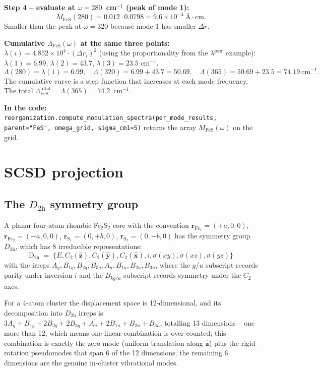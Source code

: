 \documentclass[10pt,a4paper,twoside]{article}
\newcommand{\rvec}{\mathbf{r}}
\newcommand{\xhat}{\hat{\mathbf{x}}}
\newcommand{\yhat}{\hat{\mathbf{y}}}
\newcommand{\zhat}{\hat{\mathbf{z}}}
\newcommand{\fn}[1]{\texttt{#1}}
\begin{document}
\begin{workedexample}
\textbf{Step 4 -- evaluate at $\omega = 280$~cm$^{-1}$ (peak of mode 1):}
\[
  M_\text{FeS}(280) = 0.012 \cdot 0.0798 = 9.6 \times 10^{-4}~\text{\AA{}}\cdot\text{cm}.
\]
Smaller than the peak at $\omega = 320$ because mode 1 has smaller
$\Delta r$.

\textbf{Cumulative $\Lambda_\text{FeS}(\omega)$ at the same three points:}
$\lambda(i) = 4.852 \times 10^4 \cdot (\Delta r_i)^2$ (using the
proportionality from the $\lambda^\text{pair}$ example):
$\lambda(1) = 6.99$, $\lambda(2) = 43.7$, $\lambda(3) = 23.5$
cm$^{-1}$.
\[
  \Lambda(280) = \lambda(1) = 6.99,
  \quad
  \Lambda(320) = 6.99 + 43.7 = 50.69,
  \quad
  \Lambda(365) = 50.69 + 23.5 = 74.19~\text{cm}^{-1}.
\]
The cumulative curve is a step function that increases at each
mode frequency. The total $\Lambda^\text{total}_\text{FeS} =
\Lambda(365) = 74.2$~cm$^{-1}$.

\textbf{In the code:}
\fn{reorganization.compute\_modulation\_spectra(per\_mode\_results,
parent="FeS", omega\_grid, sigma\_cm1=5)} returns the array
$M_\text{FeS}(\omega)$ on the grid.
\end{workedexample}

\section{SCSD projection}
\label{sec:scsd-derivation}

\subsection{The $D_{2\mathrm{h}}$ symmetry group}

A planar four-atom rhombic Fe$_2$S$_2$ core with the convention
$\rvec_{\text{Fe}_1} = (+a, 0, 0)$, $\rvec_{\text{Fe}_2} = (-a, 0, 0)$,
$\rvec_{\text{S}_1} = (0, +b, 0)$, $\rvec_{\text{S}_2} = (0, -b, 0)$
has the symmetry group $D_{2\mathrm{h}}$, which has 8 irreducible
representations:
\begin{equation}
  \mathrm{D}_{2\mathrm{h}} \;=\;
  \{E, C_2(\zhat), C_2(\yhat), C_2(\xhat), i, \sigma(xy), \sigma(xz), \sigma(yz)\}
\end{equation}
with the irreps $A_g, B_{1g}, B_{2g}, B_{3g}, A_u, B_{1u}, B_{2u},
B_{3u}$, where the $g$/$u$ subscript records parity under inversion
$i$ and the $B_{kg/u}$ subscript records symmetry under the $C_2$
axes.

For a 4-atom cluster the displacement space is 12-dimensional, and
its decomposition into $D_{2\mathrm{h}}$ irreps is
$3 A_g + B_{1g} + 2 B_{2g} + 2 B_{3g} + A_u + 2 B_{1u} + B_{2u} + B_{3u}$,
totalling 13 dimensions -- one more than 12, which means one
linear combination is over-counted; this combination is exactly the
zero mode (uniform translation along $\zhat$) plus the rigid-rotation
pseudomodes that span 6 of the 12 dimensions; the remaining 6
dimensions are the genuine in-cluster vibrational modes.
\end{document}
